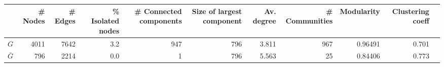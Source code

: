\begin{tabular}{lrrrrrrrrrr}
\toprule
{} &  \# Nodes &  \# Edges  &  \% Isolated nodes &  \# Connected components &  Size of largest component &  Av. degree &  \# Communities &  Modularity &  Clustering coeff \\
\midrule
$G$       &     4011 &     7642 &               3.2 &                     947 &                        796 &       3.811 &            967 &     0.96491 &             0.701 \\
$\bar{G}$ &      796 &     2214 &               0.0 &                       1 &                        796 &       5.563 &             25 &     0.84406 &             0.773 \\
\bottomrule
\end{tabular}
